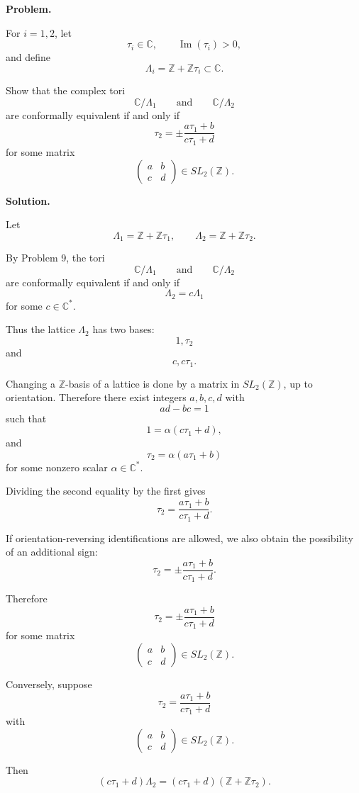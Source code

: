 \documentclass[12pt,a4paper]{article}
\theoremstyle{notespace}
\begin{document}
\textbf{Problem.}

For \(i=1,2\), let
\[
\tau_i\in\mathbb C,
\qquad
\operatorname{Im}(\tau_i)>0,
\]
and define
\[
\Lambda_i=\mathbb Z+\mathbb Z\tau_i\subset\mathbb C.
\]

Show that the complex tori
\[
\mathbb C/\Lambda_1
\qquad\text{and}\qquad
\mathbb C/\Lambda_2
\]
are conformally equivalent if and only if
\[
\tau_2
=
\pm
\frac{a\tau_1+b}{c\tau_1+d}
\]
for some matrix
\[
\begin{pmatrix}
	a & b\\
	c & d
\end{pmatrix}
\in SL_2(\mathbb Z).
\]

\bigskip

\textbf{Solution.}

Let
\[
\Lambda_1=\mathbb Z+\mathbb Z\tau_1,
\qquad
\Lambda_2=\mathbb Z+\mathbb Z\tau_2.
\]

By Problem 9, the tori
\[
\mathbb C/\Lambda_1
\qquad\text{and}\qquad
\mathbb C/\Lambda_2
\]
are conformally equivalent if and only if
\[
\Lambda_2=c\Lambda_1
\]
for some \(c\in\mathbb C^*\).

Thus the lattice \(\Lambda_2\) has two bases:
\[
1,\tau_2
\]
and
\[
c,c\tau_1.
\]

Changing a \(\mathbb Z\)-basis of a lattice is done by a matrix in
\(SL_2(\mathbb Z)\), up to orientation. Therefore there exist integers
\(a,b,c,d\) with
\[
ad-bc=1
\]
such that
\[
1=\alpha(c\tau_1+d),
\]
and
\[
\tau_2=\alpha(a\tau_1+b)
\]
for some nonzero scalar \(\alpha\in\mathbb C^*\).

Dividing the second equality by the first gives
\[
\tau_2
=
\frac{a\tau_1+b}{c\tau_1+d}.
\]

If orientation-reversing identifications are allowed, we also obtain the
possibility of an additional sign:
\[
\tau_2
=
\pm
\frac{a\tau_1+b}{c\tau_1+d}.
\]

Therefore
\[
\boxed{
	\tau_2
	=
	\pm
	\frac{a\tau_1+b}{c\tau_1+d}
}
\]
for some matrix
\[
\boxed{
	\begin{pmatrix}
		a & b\\
		c & d
	\end{pmatrix}
	\in SL_2(\mathbb Z).
}
\]

Conversely, suppose
\[
\tau_2
=
\frac{a\tau_1+b}{c\tau_1+d}
\]
with
\[
\begin{pmatrix}
	a & b\\
	c & d
\end{pmatrix}
\in SL_2(\mathbb Z).
\]

Then
\[
(c\tau_1+d)\Lambda_2
=
(c\tau_1+d)(\mathbb Z+\mathbb Z\tau_2).
\]
\end{document}
